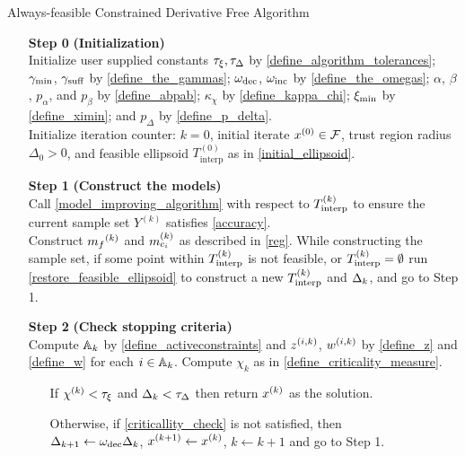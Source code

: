 \begin{algorithm}[H]
    \caption{Always-feasible Constrained Derivative Free Algorithm}	
    \label{constrained_dfo}
    \begin{itemize}
        \item[\textbf{Step 0}] \textbf{(Initialization)} \\
        	Initialize user supplied constants $\tau_{\xi}, \tau_{\Delta}$ by \cref{define_algorithm_tolerances};
        	$\gamma_{\textrm{min}}$, $\gamma_{\textrm{suff}}$ by \cref{define_the_gammas};
        	$\omega_{\text{dec}}$, $\omega_{\text{inc}}$ by \cref{define_the_omegas};
        	$\alpha$, $\beta$, $p_{\alpha}$, and $p_{\beta}$ by \cref{define_abpab};
			$\kappa_{\chi}$ by \cref{define_kappa_chi};
			$\xi_{\text{min}}$ by \cref{define_ximin};
			and $p_{\Delta}$ by \cref{define_p_delta}. \\
        	Initialize iteration counter: $k=0$, initial iterate ${x^{(0)}} \in {\mathcal F}$, trust region radius $\Delta_0 > 0$, and feasible ellipsoid $T^{(0)}_{\textrm{interp}}$ as in \cref{initial_ellipsoid}.
            
        \item[\textbf{Step 1}] \textbf{(Construct the models)} \\
        Call \cref{model_improving_algorithm} with respect to ${T_{\text{interp}}^{(k)}}$ to ensure the current sample set $Y^{(k)}$ satisfies \cref{accuracy}. \\
        Construct ${{m}_f}^{(k)}$ and ${{m}^{(k)}_{c_i}}$ as described in \cref{reg}.
        While constructing the sample set, if some point within ${T_{\text{interp}}^{(k)}}$ is not feasible, or ${T_{\text{interp}}^{(k)}} = \emptyset$ 
        run \cref{restore_feasible_ellipsoid} to construct a new ${T_{\text{interp}}^{(k)}}$ and $\Delta_k$, and go to Step 1.
        
        \item[\textbf{Step 2}] \textbf{(Check stopping criteria)} \\
        	Compute ${\mathbb A_{k}}$ by \cref{define_activeconstraints} and ${z^{(i, k)}}$, ${w^{(i, k)}}$ by \cref{define_z} and \cref{define_w} for each $i \in {\mathbb A_{k}}$.
            Compute $\chi_k$ as in \cref{define_criticality_measure}. \begin{itemize}
                \item[] If $ {\chi^{(k)}} < \tau_{\xi} $ and $\Delta_k <\tau_{\Delta}$ then return $x^{(k)}$ as the solution.
                \item[] Otherwise, if \cref{criticallity_check} is not satisfied, then \\
                $\Delta_{k+1} \gets \omega_{\text{dec}}\Delta_k$, 
                $x^{(k+1)} \gets x^{(k)}$,
                $k \gets k+1$ and go to Step 1.
            \end{itemize}
            

\end{itemize}
\end{algorithm}
